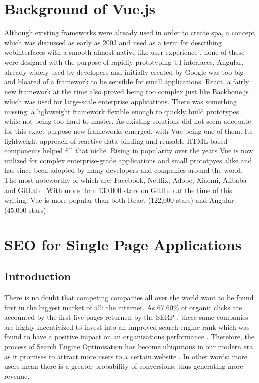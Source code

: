 \section{Background of Vue.js}
Although existing frameworks were already used in order to create \acrlong{spa}, a concept which was discussed as early as 2003 \cite{Innerbro19:online} and used as a term for describing webinterfaces with a smooth almost native-like user experience \cite{Mikowski:Powell:2013}, none of these were designed with the purpose of rapidly prototyping UI interfaces. Angular, already widely used by developers and initially created by Google was too big and bloated of a framework to be sensible for small applications. React, a fairly new framework at the time also proved being too complex just like Backbone.js which was used for large-scale enterprise applications. There was something missing: a lightweight framework flexible enough to quickly build prototypes while not being too hard to master. As existing solutions did not seem adequate for this exact purpose \cite[p.~10]{filipova2016learning} new frameworks emerged, with Vue being one of them. Its lightweight approach of reactive data-binding and reusable HTML-based components helped fill that niche. Rising in popularity over the years Vue is now utilized for complex enterprise-grade applications and small prototpyes alike and has since been adopted by many developers and companies around the world. The most noteworthy of which are: Facebook, Netflix, Adobe, Xiaomi, Alibaba and GitLab \cite{CompaniesUsingVue:online}. With more than 130,000 stars on GitHub at the time of this writing, Vue is more popular than both React (122,000 stars) and Angular (45,000 stars).

\section{SEO for Single Page Applications} \label{sec:seo}

\subsection{Introduction}
There is no doubt that competing companies all over the world want to be found first in the biggest market of all: the internet. As 67.60\% of organic clicks are accounted by the first five pages returned by the SERP \cite{Khan2018:article}, these same companies are highly incentivized to invest into an improved search engine rank which was found to have a positive impact on an organizations performance \cite{yang2015search:article}. Therefore, the process of Search Engine Optimisation has become ubiquitous in our modern era as it promises to attract more users to a certain website \cite{Khan2018:article}. In other words: more users mean there is a greater probability of conversions, thus generating more revenue.

